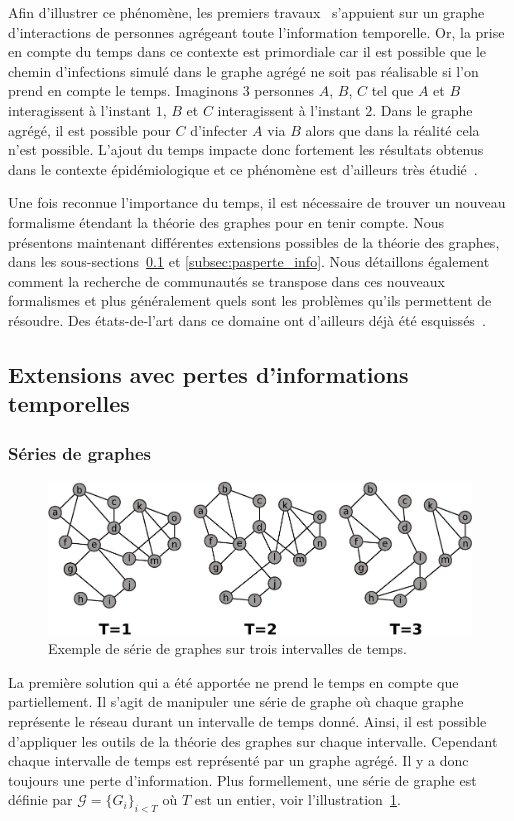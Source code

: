 Afin d'illustrer ce phénomène, les premiers travaux~\cite{Vespignani2008}
s'appuient sur un graphe d'interactions de personnes agrégeant toute l'information temporelle.
Or, la prise en compte du temps dans ce contexte est primordiale car il est possible que le chemin d'infections simulé dans le graphe agrégé ne soit pas réalisable si l'on prend en compte le temps.
Imaginons 3 personnes $A$, $B$, $C$ tel que $A$ et $B$ interagissent à l'instant $1$, $B$ et $C$ interagissent à l'instant $2$.
Dans le graphe agrégé, il est possible pour $C$ d'infecter $A$ via $B$ alors que dans la réalité cela n'est possible.
L'ajout du temps impacte donc fortement les résultats obtenus dans le contexte épidémiologique et ce phénomène est d'ailleurs très étudié~\cite{Gauvin2015,Karsai2011,Jo2014,Horvath2014,Holme2014a,Scholtes2014,Perotti2014}.

Une fois reconnue l'importance du temps, il est nécessaire de trouver un nouveau formalisme étendant la théorie des graphes pour en tenir compte.
Nous présentons maintenant différentes extensions possibles de la théorie des graphes, dans les sous-sections~\ref{subsec:perte_info} et \ref{subsec:pasperte_info}.
Nous détaillons également comment la recherche de communautés se transpose dans ces nouveaux formalismes et plus généralement quels sont les problèmes qu'ils permettent de résoudre.
Des états-de-l'art dans ce domaine ont d'ailleurs déjà été esquissés~\cite{Boccaletti2014,Cazabet2014,hartmann2014clustering}.

\subsection{Extensions avec pertes d'informations temporelles}
\label{subsec:perte_info}
\subsubsection{Séries de graphes}
\begin{figure}[h]
\centering
\includegraphics[width=0.8\linewidth]{img/Intro/TVG.eps}
\caption{Exemple de série de graphes sur trois intervalles de temps.}
\label{fig:exemple_TVG}
\end{figure}
La première solution qui a été apportée ne prend le temps en compte que partiellement.
Il s'agit de manipuler une série de graphe où chaque graphe représente le réseau durant un intervalle de temps donné.
Ainsi, il est possible d'appliquer les outils de la théorie des graphes sur chaque intervalle.
Cependant chaque intervalle de temps est représenté par un graphe agrégé.
Il y a donc toujours une perte d'information.
Plus formellement, une série de graphe est définie par $\mathcal{G}=\{G_i\}_{i < T}$ où $T$ est un entier, voir l'illustration~\ref{fig:exemple_TVG}.

